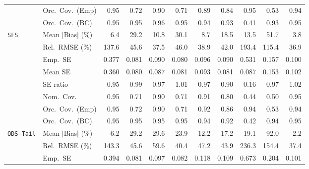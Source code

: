 \begin{landscape}
\begin{longtable}{llrrrrrrrrr}
 & Orc.\ Cov.\ (Emp) & \cellcolor{rankone}0.95 & 0.72 & \cellcolor{rankthree}0.90 & 0.71 & 0.89 & 0.84 & \cellcolor{rankone}0.95 & 0.53 & \cellcolor{ranktwo}0.94 \\
 & Orc.\ Cov.\ (BC) & \cellcolor{rankone}0.95 & \cellcolor{rankone}0.95 & \cellcolor{ranktwo}0.96 & \cellcolor{rankone}0.95 & \cellcolor{ranktwo}0.94 & \cellcolor{rankthree}0.93 & 0.41 & \cellcolor{rankthree}0.93 & \cellcolor{rankone}0.95 \\
\addlinespace[2pt]
\quad \texttt{SFS} & Mean $|$Bias$|$ (\%) & \cellcolor{ranktwo}6.4 & 29.2 & 10.8 & 30.1 & \cellcolor{rankthree}8.7 & 18.5 & 13.5 & 51.7 & \cellcolor{rankone}3.8 \\
 & Rel.\ RMSE (\%) & 137.6 & 45.6 & \cellcolor{ranktwo}37.5 & 46.0 & \cellcolor{rankthree}38.9 & 42.0 & 193.4 & 115.4 & \cellcolor{rankone}36.9 \\
 & Emp.\ SE & 0.377 & 0.081 & 0.090 & 0.080 & 0.096 & 0.090 & 0.531 & 0.157 & 0.100 \\
 & Mean SE & 0.360 & 0.080 & 0.087 & 0.081 & 0.093 & 0.081 & 0.087 & 0.153 & 0.102 \\
 & SE ratio & 0.95 & \cellcolor{rankone}0.99 & \cellcolor{rankthree}0.97 & \cellcolor{rankone}1.01 & \cellcolor{rankthree}0.97 & 0.90 & 0.16 & \cellcolor{rankthree}0.97 & \cellcolor{ranktwo}1.02 \\
 & Nom.\ Cov. & \cellcolor{rankone}0.95 & 0.71 & \cellcolor{rankthree}0.90 & 0.71 & \cellcolor{ranktwo}0.91 & 0.80 & 0.44 & 0.50 & \cellcolor{rankone}0.95 \\
 & Orc.\ Cov.\ (Emp) & \cellcolor{rankone}0.95 & 0.72 & 0.90 & 0.71 & \cellcolor{rankthree}0.92 & 0.86 & \cellcolor{ranktwo}0.94 & 0.53 & \cellcolor{ranktwo}0.94 \\
 & Orc.\ Cov.\ (BC) & \cellcolor{rankone}0.95 & \cellcolor{rankone}0.95 & \cellcolor{rankone}0.95 & \cellcolor{rankone}0.95 & \cellcolor{ranktwo}0.94 & \cellcolor{rankthree}0.92 & 0.42 & \cellcolor{ranktwo}0.94 & \cellcolor{rankone}0.95 \\
\addlinespace[2pt]
\quad \texttt{ODS-Tail} & Mean $|$Bias$|$ (\%) & \cellcolor{ranktwo}6.2 & 29.2 & 29.6 & 23.9 & \cellcolor{rankthree}12.2 & 17.2 & 19.1 & 92.0 & \cellcolor{rankone}2.2 \\
 & Rel.\ RMSE (\%) & 143.3 & 45.6 & 59.6 & \cellcolor{ranktwo}40.4 & 47.2 & \cellcolor{rankthree}43.9 & 236.3 & 154.4 & \cellcolor{rankone}37.4 \\
 & Emp.\ SE & 0.394 & 0.081 & 0.097 & 0.082 & 0.118 & 0.109 & 0.673 & 0.204 & 0.101 \\

\end{longtable}
\end{landscape}
